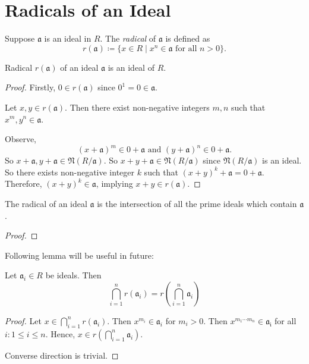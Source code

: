 \section{Radicals of an Ideal}
\begin{definition}
    Suppose \(\mathfrak{a}\) is an ideal in \(R\). The \emph{radical} of  \(\mathfrak{a}\) is defined as
\[
    r(\mathfrak{a}) \coloneq \{x \in R  \mid  x^n \in \mathfrak{a} \text{ for all } n > 0\}.
\] 
\end{definition}
\begin{proposition}
    Radical \(r(\mathfrak{a})\) of an ideal \(\mathfrak{a}\) is an ideal of \(R\).
\end{proposition}
\begin{proof}
    Firstly, \(0 \in r(\mathfrak{a})\) since \(0^1 = 0 \in \mathfrak{a}\).

    Let \(x, y \in r(\mathfrak{a})\). Then there exist non-negative integers \(m, n\) such that  \(x^m, y^n \in  \mathfrak{a}\). 

    Observe, 
    \[
        (x + \mathfrak{a})^m \in 0 + \mathfrak{a} \text{ and } (y + \mathfrak{a})^n \in 0 + \mathfrak{a}.
    \] 
    So \(x + \mathfrak{a}, y + \mathfrak{a} \in \mathfrak{N}(R/\mathfrak{a})\). So \(x + y + \mathfrak{a} \in \mathfrak{N}(R/\mathfrak{a})\) since \(\mathfrak{N}(R/\mathfrak{a})\) is an ideal. So there exists non-negative integer \(k\) such that  \((x+y)^k + \mathfrak{a} = 0 + \mathfrak{a}\). Therefore, \((x+y)^k \in \mathfrak{a}\), implying \(x+y \in r(\mathfrak{a})\).
\end{proof}
\begin{proposition}\label{prop:radIdealInteofPrimes}
    The radical of an ideal \( \mathfrak{a} \) is the intersection of all the prime ideals which contain \( \mathfrak{a} \).
\end{proposition}
\begin{proof}
\end{proof}
Following lemma will be useful in future:
\begin{lemma}\label{lem:radBigcap}
     Let \( \mathfrak{a}_i \in R\) be ideals. Then
     \[
    \bigcap_{i=1}^n r(\mathfrak{a}_i) = r\left(\bigcap_{i=1}^n \mathfrak{a}_i \right)
     \] 
\end{lemma}
    \begin{proof}
        Let \( x \in \bigcap_{i=1}^n r(\mathfrak{a}_i) \). Then \( x^{m_i} \in \mathfrak{a}_i\) for \( m_i > 0 \). Then  \( x^{m_1 \cdots m_n} \in \mathfrak{a_i}\) for all \( i: 1 \le i \le n \). Hence,  \( x \in r\left(\bigcap_{i=1}^n \mathfrak{a}_i\right)\).

        Converse direction is trivial.
    \end{proof}
